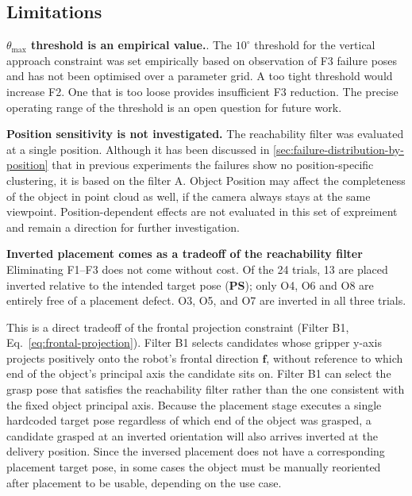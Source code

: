 \documentclass[oneside,studentpaper]{wbk}
\begin{document}

\subsection{Limitations}
\label{sec:appendix-limitations}


\textbf{$\theta_{\max}$ threshold is an empirical value.}. The $10^{\circ}$ threshold for the vertical approach constraint was set empirically based on observation of F3 failure poses and has not been optimised over a parameter grid. A too tight threshold would increase F2. One that is too loose provides insufficient F3 reduction. The precise operating range of the threshold is an open question for future work.

\textbf{Position sensitivity is not investigated.} The reachability filter was evaluated at a single position. Although it has been discussed in \cref{sec:failure-distribution-by-position} that in previous experiments the failures show no position-specific clustering, it is based on the filter A. Object Position may affect the completeness of the object in point cloud as well, if the camera always stays at the same viewpoint. Position-dependent effects are not evaluated in this set of expreiment and remain a direction for further investigation.

\textbf{Inverted placement comes as a tradeoff of the reachability filter} Eliminating F1--F3 does not come without cost. Of the 24 trials, 13 are placed inverted relative to the intended target pose (\textbf{PS}); only O4, O6 and O8 are entirely free of a placement defect. O3, O5, and O7 are inverted in all three trials.

This is a direct tradeoff of the frontal projection constraint (Filter B1, Eq.~\eqref{eq:frontal-projection}). Filter B1 selects candidates whose gripper y-axis projects positively onto the robot's frontal direction $\mathbf{f}$, without reference to which end of the object's principal axis the candidate sits on. Filter B1 can select the grasp pose that satisfies the reachability filter rather than the one consistent with the fixed object principal axis. Because the placement stage executes a single hardcoded target pose regardless of which end of the object was grasped, a candidate grasped at an inverted orientation will also arrives inverted at the delivery position. Since the inversed placement does not have a corresponding placement target pose, in some cases the object must be manually reoriented after placement to be usable, depending on the use case.
\end{document}
